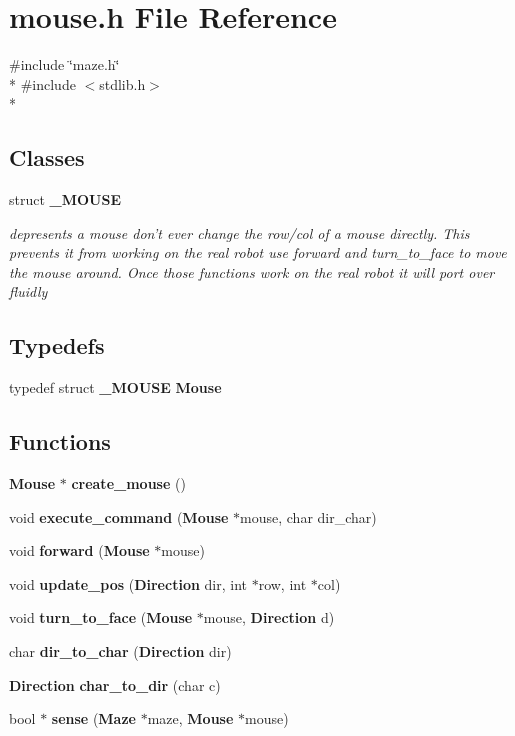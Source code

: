\section{mouse.\-h File Reference}
\label{mouse_8h}
{\ttfamily \#include \char`\"{}maze.\-h\char`\"{}}\\*
{\ttfamily \#include $<$stdlib.\-h$>$}\\*
\subsection*{Classes}
\begin{DoxyCompactItemize}
\item 
struct {\bf \-\_\-\-M\-O\-U\-S\-E}
\begin{DoxyCompactList}\small\item\em depresents a mouse don't ever change the row/col of a mouse directly. This prevents it from working on the real robot use forward and turn\-\_\-to\-\_\-face to move the mouse around. Once those functions work on the real robot it will port over fluidly \end{DoxyCompactList}\end{DoxyCompactItemize}
\subsection*{Typedefs}
\begin{DoxyCompactItemize}
\item 
typedef struct {\bf \-\_\-\-M\-O\-U\-S\-E} {\bf Mouse}
\end{DoxyCompactItemize}
\subsection*{Functions}
\begin{DoxyCompactItemize}
\item 
{\bf Mouse} $\ast$ {\bf create\-\_\-mouse} ()
\item 
void {\bf execute\-\_\-command} ({\bf Mouse} $\ast$mouse, char dir\-\_\-char)
\item 
void {\bf forward} ({\bf Mouse} $\ast$mouse)
\item 
void {\bf update\-\_\-pos} ({\bf Direction} dir, int $\ast$row, int $\ast$col)
\item 
void {\bf turn\-\_\-to\-\_\-face} ({\bf Mouse} $\ast$mouse, {\bf Direction} d)
\item 
char {\bf dir\-\_\-to\-\_\-char} ({\bf Direction} dir)
\item 
{\bf Direction} {\bf char\-\_\-to\-\_\-dir} (char c)
\item 
bool $\ast$ {\bf sense} ({\bf Maze} $\ast$maze, {\bf Mouse} $\ast$mouse)
\end{DoxyCompactItemize}


